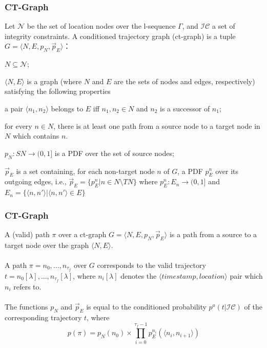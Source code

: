 \begin{frame}
\frametitle{CT-Graph}

\begin{definition}[CT-Graph]
  Let $\mathcal{N}$ be the set of location nodes over the l-sequence $\Gamma$, and $\mathcal{IC}$ a set of integrity constraints. A conditioned trajectory graph (ct-graph) is a tuple $G = \langle N, E, p_N, \vec{p}_E \rangle$：
  \begin{fitemize}
    \item $N \subseteq \mathcal{N}$;
    \item $\langle N,E \rangle$ is a graph (where $N$ and $E$ are the sets of nodes and edges, respectively) satisfying the following properties
      \begin{sitemize}
        \item a pair $\langle n_1, n_2 \rangle$ belongs to $E$ iff $n_1, n_2 \in N$ and $n_2$ is a successor of $n_1$;
        \item for every $n \in N$, there is at least one path from a source node to a target node in $N$ which contains $n$.
      \end{sitemize}
    \item $p_N: SN \rightarrow (0, 1]$ is a PDF over the set of source nodes;
    \item $\vec{p}_E$ is a set containing, for each non-target node $n$ of $G$, a PDF $p^n_E$ over its outgoing edges, i.e., $\vec{p}_E = \{ p^n_E | n \in N \setminus TN \}$ where $p^n_E: E_n \rightarrow (0,1]$ and $E_n = \{ \langle n, n' \rangle | \langle n, n' \rangle \in E \}$
  \end{fitemize}
\end{definition}

\end{frame}


\begin{frame}
\frametitle{CT-Graph}

A (valid) path $\pi$ over a ct-graph $G = \langle N,E,p_N,\vec{p}_E \rangle$ is a path from a source to a target node over the graph $\langle N,E \rangle$.\\~\\

A path $\pi = n_0, ..., n_{\tau_f}$ over $G$ corresponds to the valid trajectory $t = n_0[\lambda],...,n_{\tau_f}[\lambda]$, where $n_i[\lambda]$ denotes the $\langle timestamp, location \rangle$ pair which $n_i$ refers to.\\~\\

The functions $p_N$ and $\vec{p}_E$ is equal to the conditioned probability $p^a(t | \mathcal{IC})$ of the corresponding trajectory $t$, where
\begin{equation}
  p(\pi) = p_N(n_0) \times \prod_{i=0}^{\tau_f-1}p_E^{n_i}(\langle n_i, n_{i+1} \rangle)
\end{equation}

\end{frame}

